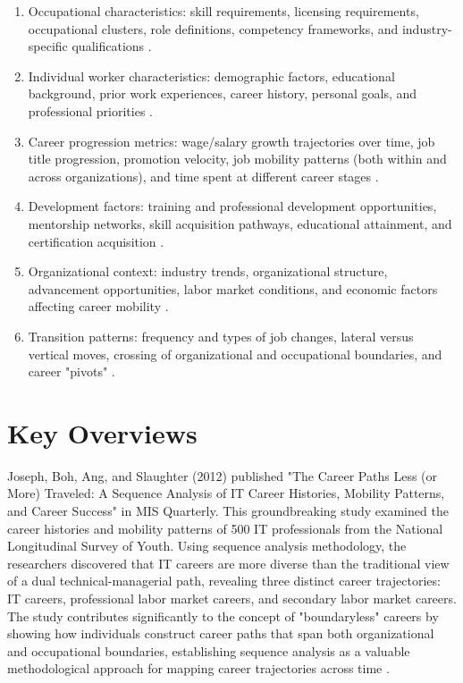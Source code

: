 \documentclass{article}
\begin{document}
\begin{enumerate}
\item Occupational characteristics: skill requirements, licensing requirements, occupational clusters, role definitions, competency frameworks, and industry-specific qualifications \citep{workforcegps2023}.

\item Individual worker characteristics: demographic factors, educational background, prior work experiences, career history, personal goals, and professional priorities \citep{workforcegps2023, hireed2021}.

\item Career progression metrics: wage/salary growth trajectories over time, job title progression, promotion velocity, job mobility patterns (both within and across organizations), and time spent at different career stages \citep{workforcegps2023}.

\item Development factors: training and professional development opportunities, mentorship networks, skill acquisition pathways, educational attainment, and certification acquisition \citep{collegerecruiter2025, ncsu2023}.

\item Organizational context: industry trends, organizational structure, advancement opportunities, labor market conditions, and economic factors affecting career mobility \citep{chronus2024}.

\item Transition patterns: frequency and types of job changes, lateral versus vertical moves, crossing of organizational and occupational boundaries, and career "pivots" \citep{joseph2012}.
\end{enumerate}

\section{Key Overviews}

Joseph, Boh, Ang, and Slaughter (2012) published "The Career Paths Less (or More) Traveled: A Sequence Analysis of IT Career Histories, Mobility Patterns, and Career Success" in MIS Quarterly. This groundbreaking study examined the career histories and mobility patterns of 500 IT professionals from the National Longitudinal Survey of Youth. Using sequence analysis methodology, the researchers discovered that IT careers are more diverse than the traditional view of a dual technical-managerial path, revealing three distinct career trajectories: IT careers, professional labor market careers, and secondary labor market careers. The study contributes significantly to the concept of "boundaryless" careers by showing how individuals construct career paths that span both organizational and occupational boundaries, establishing sequence analysis as a valuable methodological approach for mapping career trajectories across time \citep{joseph2012}.
\end{document}
